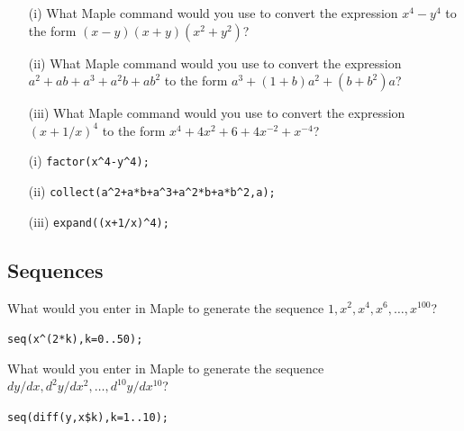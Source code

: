 \documentclass[a4paper]{article}
\begin{document}
\begin{problem}
 \begin{itemize}
  \item[(i)] What Maple command would you use to convert
   the expression $x^4-y^4$ to the form $(x-y)(x+y)(x^2+y^2)$? 
  \item[(ii)] What Maple command would you use to convert
   the expression $a^2+ab+a^3+a^2b+ab^2$ to the form 
   $a^3+(1+b)a^2+(b+b^2)a$? 
  \item[(iii)] What Maple command would you use to convert
   the expression $(x+1/x)^4$ to the form $x^4+4x^2+6+4x^{-2}+x^{-4}$? 
 \end{itemize}
\end{problem}
\begin{solution}
 \begin{itemize}
  \item[(i)] \verb~factor(x^4-y^4);~  \hspace{2em}
  \item[(ii)] \verb~collect(a^2+a*b+a^3+a^2*b+a*b^2,a);~
    \hspace{2em}
  \item[(iii)] \verb~expand((x+1/x)^4);~   \hspace{2em}
 \end{itemize}
\end{solution}




\subsection{Sequences}

\begin{problem}\label{ex-seq-i}
 What would you enter in Maple to generate the sequence
 $1,x^2,x^4,x^6,\ldots,x^{100}$?  
\end{problem}
\begin{solution}
 \verb~seq(x^(2*k),k=0..50);~ \hspace{2em}
\end{solution}

\begin{problem}\label{ex-seq-iii}
 What would you enter in Maple to generate the sequence
 $dy/dx,d^2y/dx^2,\dotsc,d^{10}y/dx^{10}$?  
\end{problem}
\begin{solution}
 \verb~seq(diff(y,x$k),k=1..10);~  \hspace{3em} 
\end{solution}
\end{document}
